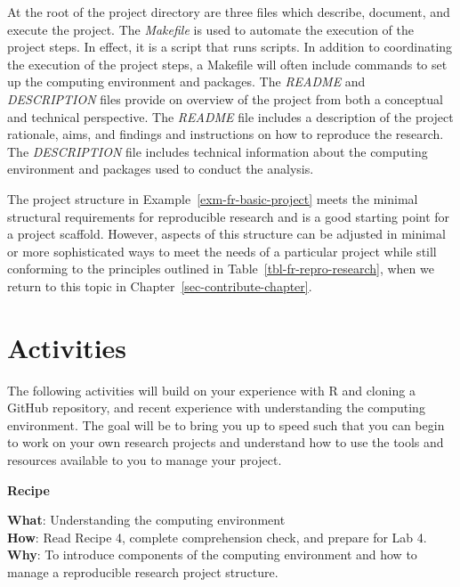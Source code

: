 \documentclass[
  letterpaper,
]{latex/krantz}
\theoremstyle{definition}
\theoremstyle{remark}
\begin{document}
At the root of the project directory are three files which describe,
document, and execute the project. The \emph{Makefile} is used to
automate the execution of the project steps. In effect, it is a script
that runs scripts. In addition to coordinating the execution of the
project steps, a Makefile will often include commands to set up the
computing environment and packages. The \emph{README} and
\emph{DESCRIPTION} files provide on overview of the project from both a
conceptual and technical perspective. The \emph{README} file includes a
description of the project rationale, aims, and findings and
instructions on how to reproduce the research. The \emph{DESCRIPTION}
file includes technical information about the computing environment and
packages used to conduct the analysis.

The project structure in Example~\ref{exm-fr-basic-project} meets the
minimal structural requirements for reproducible research and is a good
starting point for a project scaffold. However, aspects of this
structure can be adjusted in minimal or more sophisticated ways to meet
the needs of a particular project while still conforming to the
principles outlined in Table~\ref{tbl-fr-repro-research}, when we return
to this topic in Chapter~\ref{sec-contribute-chapter}.

\section*{Activities}\label{activities-2}


The following activities will build on your experience with R and
cloning a GitHub repository, and recent experience with understanding
the computing environment. The goal will be to bring you up to speed
such that you can begin to work on your own research projects and
understand how to use the tools and resources available to you to manage
your project.

\begin{tcolorbox}[enhanced jigsaw, breakable, leftrule=.75mm, arc=.35mm, colframe=quarto-callout-color-frame, colback=white, left=2mm, bottomrule=.15mm, rightrule=.15mm, toprule=.15mm, opacityback=0]

\textbf{ Recipe}

\textbf{What}: Understanding the computing environment\\
\textbf{How}: Read Recipe 4, complete comprehension check, and prepare
for Lab 4.\\
\textbf{Why}: To introduce components of the computing environment and
how to manage a reproducible research project structure.

\end{tcolorbox}
\end{document}
